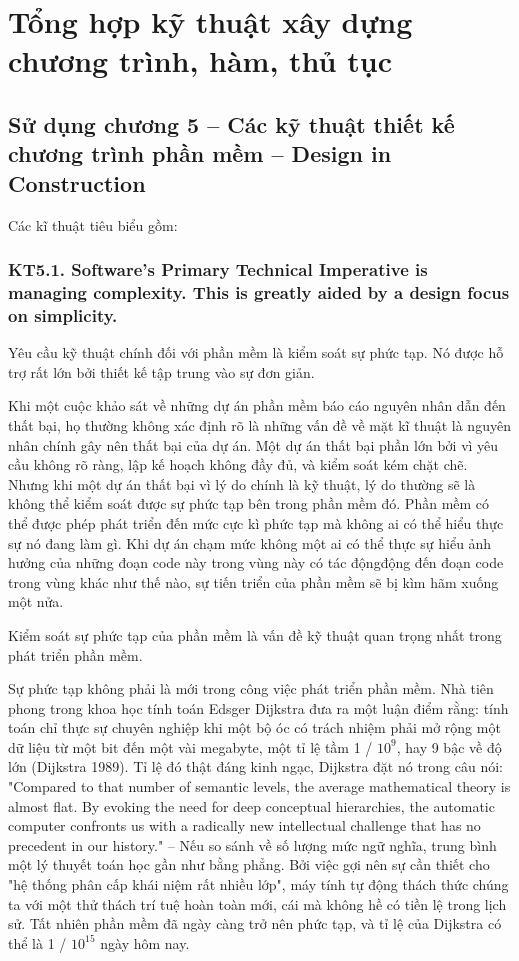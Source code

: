 \documentclass[12pt]{report}
\begin{document}
\section{\bfseries Tổng hợp kỹ thuật xây dựng chương trình, hàm, thủ tục}

\subsection{Sử dụng chương 5 -- Các kỹ thuật thiết kế chương trình phần mềm -- Design in Construction}
\noindent Các kĩ thuật tiêu biểu gồm:

\subsubsection{KT5.1. Software's Primary Technical Imperative is managing complexity. This is greatly aided by a design focus on simplicity.}
Yêu cầu kỹ thuật chính đối với phần mềm là kiểm soát sự phức tạp. Nó được hỗ trợ rất lớn bởi thiết kế tập trung vào sự đơn giản. 
\vspace*{3mm}


Khi một cuộc khảo sát về những dự án phần mềm báo cáo nguyên nhân dẫn đến thất bại, họ thường không xác định rõ là những vấn đề về mặt kĩ thuật là nguyên nhân chính gây nên thất bại của dự án. Một dự án thất bại phần lớn bởi vì yêu cầu không rõ ràng, lập kế hoạch không đầy đủ, và kiểm soát kém chặt chẽ. Nhưng khi một dự án thất bại vì lý do chính là kỹ thuật, lý do thường sẽ là không thể kiểm soát được sự phức tạp bên trong phần mềm đó. Phần mềm có thể được phép phát triển đến mức cực kì phức tạp mà không ai có thể hiểu thực sự nó đang làm gì. Khi dự án chạm mức không một ai có thể thực sự hiểu ảnh hưởng của những đoạn code này trong vùng này có tác độngđộng đến đoạn code trong vùng khác như thế nào, sự tiến triển của phần mềm sẽ bị kìm hãm xuống một nửa. 

Kiểm soát sự phức tạp của phần mềm là vấn đề kỹ thuật quan trọng nhất trong phát triển phần mềm.

Sự phức tạp không phải là mới trong công việc phát triển phần mềm. Nhà tiên phong trong khoa học tính toán Edsger Dijkstra đưa ra một luận điểm rằng: tính toán chỉ thực sự chuyên nghiệp khi một bộ óc có trách nhiệm phải mở rộng một dữ liệu từ một bit đến một vài megabyte, một tỉ lệ tầm 1 / $10^9$, hay 9 bậc về độ lớn (Dijkstra 1989). Tỉ lệ đó thật đáng kinh ngạc, Dijkstra đặt nó trong câu nói: "Compared to that number
of semantic levels, the average mathematical theory is almost flat. By evoking
the need for deep conceptual hierarchies, the automatic computer confronts us
with a radically new intellectual challenge that has no precedent in our history." -- Nếu so sánh về số lượng mức ngữ nghĩa, trung bình một lý thuyết toán học gần như bằng phẳng. Bởi việc gợi nên sự cần thiết cho "hệ thống phân cấp khái niệm rất nhiều lớp",  máy tính tự động thách thức chúng ta với một thử thách trí tuệ hoàn toàn mới, cái mà không hề có tiền lệ trong lịch sử. Tất nhiên phần mềm đã ngày càng trở nên phức tạp, và tỉ lệ của  Dijkstra có thể là 1 / $10^{15}$ ngày hôm nay. 
\end{document}
